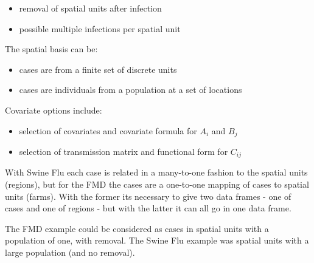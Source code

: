 \documentclass{article}
\begin{document}
\begin{itemize}
\item removal of spatial units after infection
\item possible multiple infections per spatial unit
\end{itemize}

The spatial basis can be:

\begin{itemize}
\item cases are from a finite set of discrete units
\item cases are individuals from a population at a set of locations
\end{itemize}

Covariate options include:

\begin{itemize}
\item selection of covariates and covariate formula for $A_i$ and $B_j$
\item selection of transmission matrix and functional form for $C_{ij}$
\end{itemize}

With Swine Flu each case is related in a many-to-one fashion to the spatial units (regions), but for
the FMD the cases are a one-to-one mapping of cases to spatial units (farms). With the former its necessary to give
two data frames - one of cases and one of regions - but with the latter it can all go in one data frame.

The FMD example could be considered as cases in spatial units with a population of one, with removal. The Swine Flu example
was spatial units with a large population (and no removal).
\end{document}
